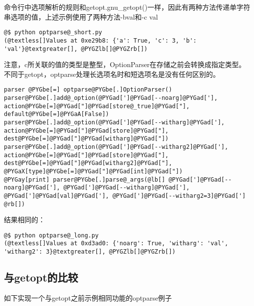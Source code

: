 \documentclass[a4paper,10pt,english]{manual}
\begin{document}
命令行中选项解析的规则和getopt.gnu\_getopt()一样，因此有两种方法传递单字符串选项的值，上述示例使用了两种方法-bval和-c val

\begin{Verbatim}[commandchars=@\[\]]
@$ python optparse@_short.py
(@textless[]Values at 0xe29b8: {'a': True, 'c': 3, 'b': 'val'}@textgreater[], @PYGZlb[]@PYGZrb[])
\end{Verbatim}

注意，c所关联的值的类型是整型，OptionParser在存储之前会转换成指定类型。不同于getopt，optparse处理长选项名时和短选项名是没有任何区别的。

\begin{Verbatim}[commandchars=@\[\]]
parser @PYGbe[=] optparse@PYGbe[.]OptionParser()
parser@PYGbe[.]add@_option(@PYGad[']@PYGad[--noarg]@PYGad['], action@PYGbe[=]@PYGad["]@PYGad[store@_true]@PYGad["], default@PYGbe[=]@PYGaA[False])
parser@PYGbe[.]add@_option(@PYGad[']@PYGad[--witharg]@PYGad['], action@PYGbe[=]@PYGad["]@PYGad[store]@PYGad["], dest@PYGbe[=]@PYGad["]@PYGad[witharg]@PYGad["])
parser@PYGbe[.]add@_option(@PYGad[']@PYGad[--witharg2]@PYGad['], action@PYGbe[=]@PYGad["]@PYGad[store]@PYGad["], dest@PYGbe[=]@PYGad["]@PYGad[witharg2]@PYGad["], @PYGaX[type]@PYGbe[=]@PYGad["]@PYGad[int]@PYGad["])
@PYGay[print] parser@PYGbe[.]parse@_args(@lb[] @PYGad[']@PYGad[--noarg]@PYGad['], @PYGad[']@PYGad[--witharg]@PYGad['], @PYGad[']@PYGad[val]@PYGad['], @PYGad[']@PYGad[--witharg2=3]@PYGad['] @rb[])
\end{Verbatim}

结果相同的：

\begin{Verbatim}[commandchars=@\[\]]
@$ python optparse@_long.py
(@textless[]Values at 0xd3ad0: {'noarg': True, 'witharg': 'val', 'witharg2': 3}@textgreater[], @PYGZlb[]@PYGZrb[])
\end{Verbatim}


\subsection{与getopt的比较}

如下实现一个与getopt之前示例相同功能的optparse例子
\end{document}
